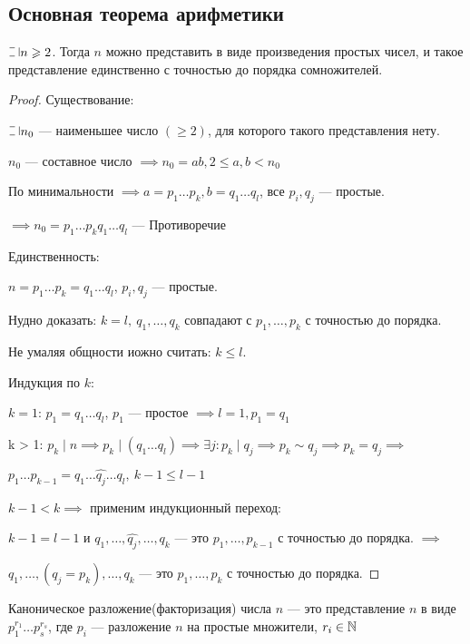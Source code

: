 \subsection{Основная теорема арифметики}

\begin{theorem}
    $\letus n \geq 2$. Тогда $n$ можно представить в виде произведения простых чисел, и такое представление единственно с точностью до порядка сомножителей.    
\end{theorem}

\begin{proof}
    
    Существование:
    
    $\letus n_0$ --- наименьшее число $(\geq 2)$, для которого такого представления нету.
    
    $n_0$ --- составное число $\implies n_0 = ab, 2 \leq a, b < n_0$
    
    По минимальности $\implies a = p_1 \ldots p_k, b = q_1 \ldots q_l$, все $p_i, q_j$ --- простые.
    
    $\implies n_0 = p_1 \ldots p_k q_1 \ldots q_l$ --- Противоречие
    
    Единственность:
    
    $n = p_1 \ldots p_k = q_1 \ldots q_l$, $p_i, q_j$ --- простые.
    
    Нудно доказать: $k = l,~q_1, \ldots, q_k$ совпадают с $p_1, \ldots, p_k$ с точностью до порядка.
    
    Не умаляя общности иожно считать: $k \leq l$. 
    
    Индукция по $k$:
    
    $k = 1$: $p_1 = q_1 \ldots q_l$, $p_1$ --- простое $\implies l = 1, p_1 = q_1$
    
    k > 1: $p_k \mid n \implies p_k \mid (q_1 \ldots q_l) \implies \exists j : p_k \mid q_j \implies p_k \sim q_j \implies p_k = q_j \implies$
    
    $p_1 \ldots p_{k-1} = q_1 \ldots \hat{q_j} \ldots q_l,~k-1 \leq l-1$
    
    $k-1 < k \implies$ применим индукционный переход:
    
    $k-1 = l-1$ и $q_1, \ldots, \hat{q_j}, \ldots, q_k$ --- это $p_1, \ldots, p_{k-1}$ с точностью до порядка. $\implies$
    
    $q_1, \ldots, (q_j = p_k), \ldots, q_k$ --- это $p_1, \ldots, p_k$ с точностью до порядка.
\end{proof}

\begin{defn}
    Каноническое разложение(факторизация) числа $n$ --- это представление $n$ в виде $p_1^{r_1} \ldots p_s^{r_s}$, где $p_i$ --- разложение $n$ на простые множители, $r_i \in \mathbb{N}$
\end{defn}

